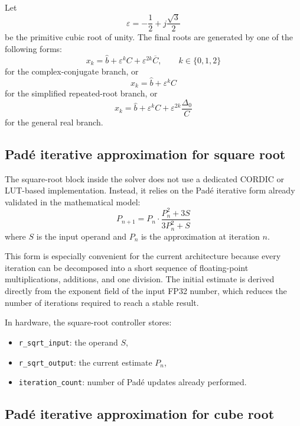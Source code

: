 Let
\begin{equation}
\varepsilon = -\frac{1}{2} + j\frac{\sqrt{3}}{2}
\end{equation}
be the primitive cubic root of unity. The final roots are generated by one of the following forms:
\begin{equation}
x_k = \hat{b} + \varepsilon^k C + \varepsilon^{2k}\overline{C}, \qquad k \in \{0,1,2\}
\end{equation}
for the complex-conjugate branch, or
\begin{equation}
x_k = \hat{b} + \varepsilon^k C
\end{equation}
for the simplified repeated-root branch, or
\begin{equation}
x_k = \hat{b} + \varepsilon^k C + \varepsilon^{2k}\frac{\Delta_0}{C}
\end{equation}
for the general real branch.

\subsection{Pad\'e iterative approximation for square root}

The square-root block inside the solver does not use a dedicated CORDIC or LUT-based implementation. Instead, it relies on the Pad\'e iterative form already validated in the mathematical model:
\begin{equation}
P_{n+1} = P_n \cdot \frac{P_n^2 + 3S}{3P_n^2 + S}
\end{equation}
where $S$ is the input operand and $P_n$ is the approximation at iteration $n$.

This form is especially convenient for the current architecture because every iteration can be decomposed into a short sequence of floating-point multiplications, additions, and one division. The initial estimate is derived directly from the exponent field of the input FP32 number, which reduces the number of iterations required to reach a stable result.

In hardware, the square-root controller stores:
\begin{itemize}
    \item \texttt{r\_sqrt\_input}: the operand $S$,
    \item \texttt{r\_sqrt\_output}: the current estimate $P_n$,
    \item \texttt{iteration\_count}: number of Pad\'e updates already performed.
\end{itemize}

\subsection{Pad\'e iterative approximation for cube root}

